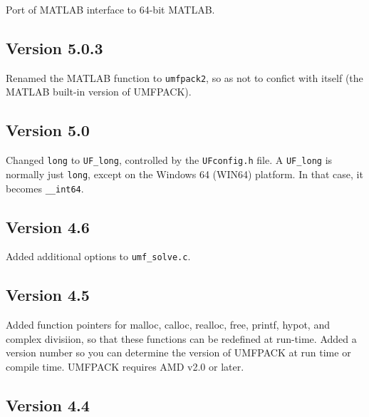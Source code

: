 \documentclass[11pt]{article}
\begin{document}
Port of MATLAB interface to 64-bit MATLAB.

\subsection{Version 5.0.3}

Renamed the MATLAB function to {\tt umfpack2}, so as not to confict with
itself (the MATLAB built-in version of UMFPACK).

\subsection{Version 5.0}

Changed {\tt long} to \verb'UF_long', controlled by the {\tt UFconfig.h}
file.  A \verb'UF_long' is normally just {\tt long}, except on the Windows 64
(WIN64) platform.  In that case, it becomes {\tt \_\_int64}.

\subsection{Version 4.6}

Added additional options to {\tt umf\_solve.c}.

\subsection{Version 4.5}

Added function pointers for malloc, calloc, realloc, free, printf, hypot,
and complex divisiion, so that these functions can be redefined at run-time.
Added a version number so you can determine the
version of UMFPACK at run time or compile time.  UMFPACK requires AMD v2.0
or later.

\subsection{Version 4.4}
\end{document}
